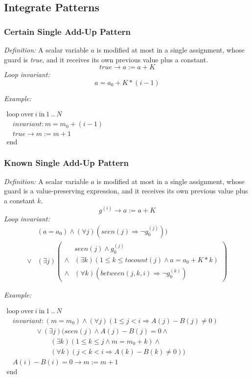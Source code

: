 \documentclass[a4paper,10pt]{article}
\newcommand{\idx}{\ensuremath{i}\xspace}
\newcommand{\at}[1]{{(#1)}}
\newcommand{\KWloop}{\ensuremath{\mathrm{loop}~}}
\newcommand{\KWend}{\ensuremath{\mathrm{end}~}}
\newcommand{\KWover}{\ensuremath{\mathrm{over}~}}
\newcommand{\KWin}{\ensuremath{~\mathrm{in}~}}
\newcommand{\impl}{\ensuremath{\Longrightarrow}}
\newcommand{\seen}[1]{\ensuremath{\mathit{seen}(#1)}\xspace}
\newcommand{\tocount}[1]{\ensuremath{\mathit{tocount}(#1)}\xspace}
\newcommand{\between}[3]{\ensuremath{\mathit{between}{(#1,#2,#3)}}\xspace}
\newcommand{\loopinvariant}{\noindent\textit{Loop invariant:}\xspace}
\newcommand{\patterndef}{\noindent\textit{Definition:}\xspace}
\newcommand{\patternexample}{\noindent\textit{Example:}\xspace}
\begin{document}
\subsection{Integrate Patterns}

\subsubsection*{Certain Single Add-Up Pattern}

\patterndef A scalar variable $a$ is modified at most in a single assignment, whose
guard is \textit{true}, and it receives its own previous value plus a constant.
%
$$\mathit{true} \rightarrow a := a + K$$
%
\loopinvariant
%
$$a = a_0 + K * (i-1)$$

\bigskip
\patternexample

\medskip
$\begin{array}{l}
  \KWloop \KWover i \KWin 1~..~N \\
  ~~~~ \textit{invariant}: m = m_0 + (i-1)\\
  ~~~~ true \rightarrow m := m+1\\
  \KWend
\end{array}$

\subsubsection*{Known Single Add-Up Pattern}

\patterndef A scalar variable $a$ is modified at most in a single assignment, whose
guard is a value-preserving expression, and it receives its own previous value plus a constant $k$.
%
$$g^\at{\idx} \rightarrow a := a + K$$
%
\loopinvariant
%
\begin{eqnarray*}
&(a = a_0) \land (\forall j)(\seen{j} \impl \neg g_0^\at{j})) \\
\lor 
& (\exists j)
\left(\begin{array}{cl}
&\seen{j} \land g_0^\at{j}\\
 \land& (\exists k)(1 \leq k \leq \tocount{j} \land a = a_0 + K * k) \\
\land& (\forall k)(\between{j}{k}{\idx} \impl \neg g_0^\at{k})
\end{array}\right)
\end{eqnarray*}

\bigskip
\patternexample

\medskip
$\begin{array}{l}
  \KWloop \KWover i \KWin 1~..~N \\
  ~~~~ \textit{invariant}: (m = m_0) \land (\forall j)(1\leq j < i \impl A(j)-B(j)\neq0)\\
  ~~~~~~~~~~~~~~~~~~~ \lor (\exists j)(\seen{j} \land A(j)-B(j)= 0 \land \\
  ~~~~~~~~~~~~~~~~~~~~~~~~~~~~~ (\exists k)(1 \leq k \leq j \land m = m_0 + k) \land\\
  ~~~~~~~~~~~~~~~~~~~~~~~~~~~~~ (\forall k)(j < k < i \impl A(k)-B(k)\neq0))\\
  ~~~~ A(i)-B(i)=0 \rightarrow m := m+1\\
  \KWend
\end{array}$
\end{document}
